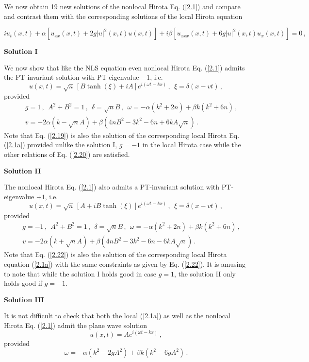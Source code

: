 \documentclass[11pt]{article}
\newcommand{\be}{\begin{equation}}
\newcommand{\ee}{\end{equation}}
\newcommand{\bea}{\begin{eqnarray}}
\newcommand{\eea}{\end{eqnarray}}
\begin{document}
We now obtain 19 new solutions of the nonlocal Hirota Eq. (\ref{2.1})
and compare and contrast them with the corresponding solutions of the
local Hirota equation

\be\label{2.1a}
iu_t(x,t)+\alpha[u_{xx}(x,t)+2g |u|^2(x,t) u(x,t)] 
+i\beta[u_{xxx}(x,t)+6g |u|^2(x,t) u_{x}(x,t)] = 0\,,
\ee

{\bf Solution I}

We now show that like the NLS equation \cite{zs} even nonlocal Hirota Eq. (\ref{2.1}) 
admits the PT-invariant solution with PT-eigenvalue $-1$, i.e. 
\be\label{2.19}
u(x,t) = \sqrt{n}\, [B\tanh(\xi)+iA] e^{i(\omega t-kx)}\,,~~\xi = 
\delta(x-vt)\,,
\ee
provided
\bea\label{2.20}
&&g = 1\,,~~A^2+B^2 = 1\,,~~\delta = \sqrt{n} B\,,~~\omega 
= -\alpha(k^2+2n)+\beta k(k^2+6n)\,, \nonumber \\
&&v = -2\alpha(k-\sqrt{n} A) +\beta(4n B^2-3k^2-6n+6kA\sqrt{n})\,.
\eea
Note that Eq. (\ref{2.19}) is also the solution of the 
corresponding local Hirota Eq. (\ref{2.1a}) 
provided unlike the solution I, $g = -1$ in the local Hirota case while the 
other relations of Eq. (\ref{2.20}) are satisfied.

{\bf Solution II}

The nonlocal Hirota Eq. (\ref{2.1}) also admits a PT-invariant solution
with PT-eigenvalue +$1$, i.e.
\be\label{2.21}
u(x,t) = \sqrt{n}\, [A+iB\tanh(\xi)] e^{i(\omega t-kx)}\,,~~\xi = 
\delta(x-vt)\,,
\ee
provided
\bea\label{2.22}
&&g = -1\,,~~A^2+B^2 = 1\,,~~\delta = \sqrt{n} B\,,
~~\omega = -\alpha(k^2+2n)+\beta k(k^2+6n)\,, \nonumber \\
&&v = -2\alpha(k+\sqrt{n} A) +\beta(4n B^2-3k^2-6n-6kA\sqrt{n})\,.
\eea
Note that Eq. (\ref{2.22}) is also the solution of the 
corresponding local Hirota equation (\ref{2.1a}) with the same
constraints as given by Eq. (\ref{2.22}).
It is amusing to note that while the solution I holds good in case $g = 1$,
the solution II only holds good if $g = -1$.

{\bf Solution III}

It is not difficult to check that both the local (\ref{2.1a}) as well as the 
nonlocal Hirota Eq. (\ref{2.1}) admit the plane wave solution
\be\label{2.1d}
u(x,t) = A e^{i(\omega t-kx)}\,,
\ee
provided
\be\label{2.1e}
\omega = -\alpha(k^2-2g A^2) +\beta k(k^2-6gA^2)\,.
\ee
\end{document}
